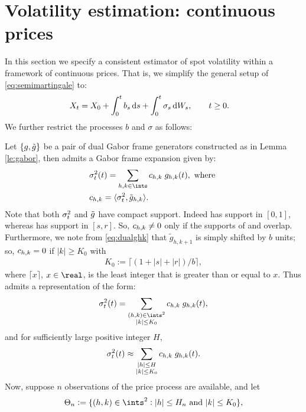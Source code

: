 \section{Volatility estimation: continuous prices } \label{sec:estimator}
In this section we specify a consistent estimator of  spot volatility within a framework of continuous prices. That is, we simplify the general setup of \eqref{eq:semimartingale} to:
\begin{align}
  X_t & = X_0 + \int_0^t b_s \D s + \int_0^t \sigma_s \D W_s,    \qquad t \ge 0 
  \label{eq:contsemimartingale}.
\end{align}
We further restrict the processes $b$ and $\sigma$ as follows: 

Let $\{g, \tilde{g}\}$ be a pair of dual Gabor frame generators constructed as in Lemma \ref{le:gabor}, then   \sv admits a Gabor frame expansion given by:  
\begin{align}
  &\sv(t)  = \sum_{h,k \in \ints} \chk \;g_{h,k}(t), \text{ where } 
\\
&\chk = \langle \sv, \tilde{g}_{h,k} \rangle. \label{eq:chk}
\end{align}
Note that both $\sigma_t^2$ and $\tilde{g}$ have compact support. Indeed \sv has support in $[0,1]$, whereas  \tg has support in $[s,r]$. So, ${c}_{h,k} \ne 0$ only if  the supports of \sv and \tghk overlap.  Furthermore, we note from \eqref{eq:dualghk} that $\tilde{g}_{h,k+1}$ is simply \tghk shifted by $b$ units; so, ${c}_{h,k} = 0$ if $|k| \ge K_0$ with 
\begin{align}
  K_0:= \lceil ( 1 + |s| + |r|)/b \rceil,
\end{align}
where $\lceil x\rceil$, $x \in \real$, is the least  integer that is greater than or equal to   $x$.  Thus \sv admits a  representation of the form: 
\begin{align}
  \sv(t) =  \sum_{\substack{(h,k) \in \ints^2\\\vert k \vert \le K_0}} \chk\;g_{h,k}(t) ,\notag
\end{align}
and  for sufficiently large positive integer $H$, 
 \begin{align}
 \sigma_t^2(t) \approx \sum_{\substack{\vert h \vert \le H \\\vert k \vert \le K_0}} {c}_{h,k}\;g_{h,k}(t). \notag
  \notag
   \label{}
 \end{align}
 Now, suppose $n$ observations of the price process are available, and let 
\begin{align}
  \Theta_n := \{(h,k) \in \ints^2 : |h| \le H_n \text{ and }|k| \le K_0\},
  \label{eq:theta}
\end{align}
